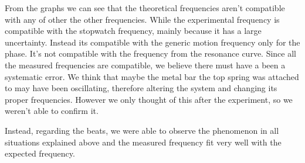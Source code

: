\documentclass{article}
\begin{document}
From the graphs we can see that the theoretical frequencies aren't compatible with any of other the other frequencies. While the experimental frequency is compatible with the stopwatch frequency, mainly because it has a large uncertainty. Instead its compatible with the generic motion frequency only for the phase. It's not compatible with the frequency from the resonance curve. Since all the measured frequencies are compatible, we believe  there must have a been a systematic error. We think that maybe the metal bar the top spring was attached to may have been oscillating, therefore altering the system and changing its proper frequencies. However we only thought of this after the experiment, so we weren't able to confirm it. 

Instead, regarding the beats, we were able to observe the phenomenon in all situations explained above and the measured frequency fit very well with the expected frequency.
\end{document}
